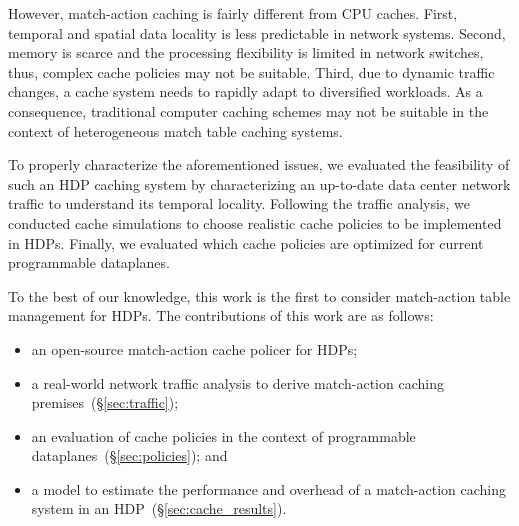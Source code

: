 However, match-action caching is fairly different from CPU caches.
First, temporal and spatial data locality is less predictable in network systems.
Second, memory is scarce and the processing flexibility is limited in network switches, thus, complex cache policies may not be suitable.
Third, due to dynamic traffic changes, a cache system needs to rapidly adapt to diversified workloads.
As a consequence, traditional computer caching schemes may not be suitable in the context of heterogeneous match table caching systems. 


To properly characterize the aforementioned issues, we evaluated the feasibility of such an HDP caching system by characterizing an up-to-date data center network traffic to understand its temporal locality.
Following the traffic analysis, we conducted cache simulations to choose realistic cache policies to be implemented in HDPs.
Finally, we evaluated which cache policies are optimized for current programmable dataplanes.%

To the best of our knowledge, this work is the first to consider match-action table management for HDPs.
The contributions of this work are as follows: 

\begin{itemize}[noitemsep,topsep=0pt]
	\item an open-source match-action cache policer for HDPs;
	\item a real-world network traffic analysis to derive match-action caching premises~(\S\ref{sec:traffic});
	\item an evaluation of cache policies in the context of programmable dataplanes~(\S\ref{sec:policies}); and
	\item a model to estimate the performance and overhead of a match-action caching system in an HDP~(\S\ref{sec:cache_results}).
\end{itemize}


